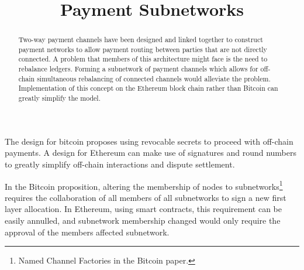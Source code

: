\documentclass[12pt]{article}
\title{Payment Subnetworks\vspace{-5em}}
\date{}
\author{}
\begin{document}
\maketitle
\begin{abstract}
Two-way payment channels have been designed and linked together to construct payment networks to allow payment routing between parties that are not directly connected. A problem that members of this architecture might face is the need to rebalance ledgers. Forming a subnetwork of payment channels which allows for off-chain simultaneous rebalancing of connected channels would alleviate the problem. Implementation of this concept on the Ethereum block chain rather than Bitcoin can greatly simplify the model.
\end{abstract}

The design for bitcoin proposes using revocable secrets to proceed with off-chain payments. A design for Ethereum can make use of signatures and round numbers to greatly simplify off-chain interactions and dispute settlement.

In the Bitcoin proposition, altering the membership of nodes to subnetworks\footnote{Named Channel Factories in the Bitcoin paper.} requires the collaboration of all members of all subnetworks to sign a new first layer allocation. In Ethereum, using smart contracts, this requirement can be easily annulled, and subnetwork membership changed would only require the approval of the members affected subnetwork.
\end{document}
